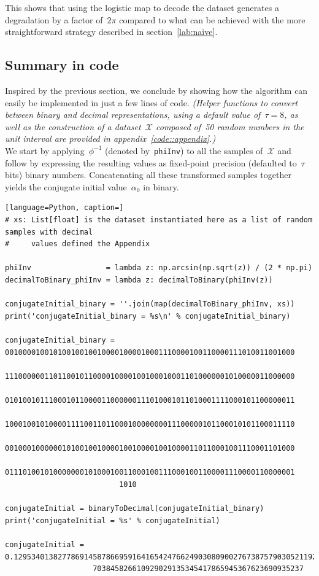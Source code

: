 \documentclass{article}
\begin{document}
\noindent This shows that using the logistic map to decode the dataset generates a degradation by a factor of~$2\pi$ compared to what can be achieved with the more straightforward strategy described in section~\ref{lab:naive}.

\subsection{Summary in code}

Inspired by the previous section, we conclude by showing how the algorithm can easily be implemented in just a few lines of code.  {\it (Helper functions to convert between binary and decimal representations, using a default value of~$\tau=8$, as well as the construction of a dataset~$\mathcal{X}$ composed of~50 random numbers in the unit interval are provided in appendix~\ref{code::appendix}.)}  \\

\noindent We start by applying~$\phi^{-1}$ (denoted by~\texttt{phiInv}) to all the samples of~$\mathcal{X}$ and follow by expressing the resulting values as fixed-point precision (defaulted to~$\tau$ bits) binary numbers.  Concatenating all these transformed samples together yields the conjugate initial value~$\alpha_0$ in binary.  \\
\begin{lstlisting}[language=Python, caption=]
# xs: List[float] is the dataset instantiated here as a list of random samples with decimal
#     values defined the Appendix

phiInv                 = lambda z: np.arcsin(np.sqrt(z)) / (2 * np.pi)
decimalToBinary_phiInv = lambda z: decimalToBinary(phiInv(z))

conjugateInitial_binary = ''.join(map(decimalToBinary_phiInv, xs))
print('conjugateInitial_binary = %s\n' % conjugateInitial_binary)

conjugateInitial_binary = 001000010010100100100100001000010001110000100110000111010011001000
                          111000000110110010110000100001001000100011010000001010000011000000
                          010100101110001011000011000000111010001011010001111000101100000011
                          100010010100001111001101100010000000011100000101100010101100011110
                          001000100000010100100100001001000010010000110110001001110001101000
                          011101001010000000101000100110001001110001001100001110000110000001
                          1010

conjugateInitial = binaryToDecimal(conjugateInitial_binary)
print('conjugateInitial = %s' % conjugateInitial)

conjugateInitial = 0.12953401382778691458786695916416542476624903080900276738757903052119237
                    703845826610929029135345417865945367623690935237

\end{lstlisting}
\end{document}
